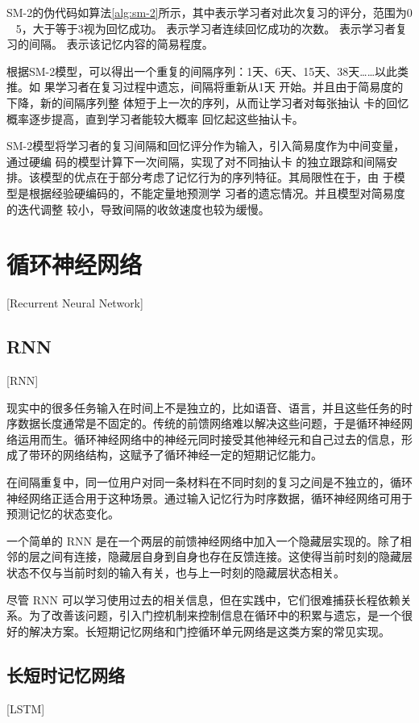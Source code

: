 SM-2的伪代码如算法\ref{alg:sm-2}所示，其中表示学习者对此次复习的评分，范围为0 ~ 5，大于等于3视为回忆成功。 表示学习者连续回忆成功的次数。 表示学习者复习的间隔。 表示该记忆内容的简易程度。

根据SM-2模型，可以得出一个重复的间隔序列：1天、6天、15天、38天……以此类推。如 果学习者在复习过程中遗忘，间隔将重新从1天 开始。并且由于简易度的下降，新的间隔序列整 体短于上一次的序列，从而让学习者对每张抽认 卡的回忆概率逐步提高，直到学习者能较大概率 回忆起这些抽认卡。

SM-2模型将学习者的复习间隔和回忆评分作为输入，引入简易度作为中间变量，通过硬编 码的模型计算下一次间隔，实现了对不同抽认卡 的独立跟踪和间隔安排。该模型的优点在于部分考虑了记忆行为的序列特征。其局限性在于，由 于模型是根据经验硬编码的，不能定量地预测学 习者的遗忘情况。并且模型对简易度的迭代调整 较小，导致间隔的收敛速度也较为缓慢。

\section{循环神经网络}[Recurrent Neural Network]

\subsection{RNN}[RNN]

现实中的很多任务输入在时间上不是独立的，比如语音、语言，并且这些任务的时序数据长度通常是不固定的。传统的前馈网络难以解决这些问题，于是循环神经网络运用而生。循环神经网络中的神经元同时接受其他神经元和自己过去的信息，形成了带环的网络结构，这赋予了循环神经一定的短期记忆能力。

在间隔重复中，同一位用户对同一条材料在不同时刻的复习之间是不独立的，循环神经网络正适合用于这种场景。通过输入记忆行为时序数据，循环神经网络可用于预测记忆的状态变化。

一个简单的 RNN 是在一个两层的前馈神经网络中加入一个隐藏层实现的。除了相邻的层之间有连接，隐藏层自身到自身也存在反馈连接。这使得当前时刻的隐藏层状态不仅与当前时刻的输入有关，也与上一时刻的隐藏层状态相关。

尽管 RNN 可以学习使用过去的相关信息，但在实践中，它们很难捕获长程依赖关系。为了改善该问题，引入门控机制来控制信息在循环中的积累与遗忘，是一个很好的解决方案。长短期记忆网络和门控循环单元网络是这类方案的常见实现。

\subsection{长短时记忆网络}[LSTM]

